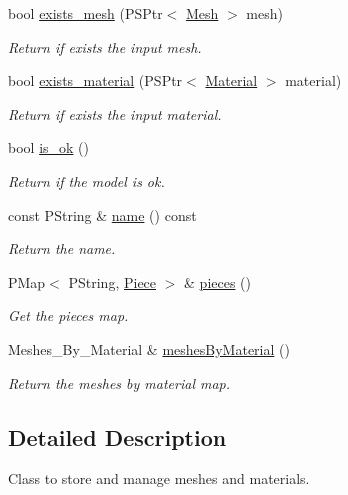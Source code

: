 \begin{DoxyCompactItemize}
bool \mbox{\hyperlink{classprz_1_1_model_a9abedee0fc21b70b26df34720dfa376c}{exists\+\_\+mesh}} (P\+S\+Ptr$<$ \mbox{\hyperlink{classprz_1_1_mesh}{Mesh}} $>$ mesh)
\begin{DoxyCompactList}\small\item\em Return if exists the input mesh. \end{DoxyCompactList}\item 
bool \mbox{\hyperlink{classprz_1_1_model_a7d0d73cf0a3adf35a3a2cceddbde878e}{exists\+\_\+material}} (P\+S\+Ptr$<$ \mbox{\hyperlink{classprz_1_1_material}{Material}} $>$ material)
\begin{DoxyCompactList}\small\item\em Return if exists the input material. \end{DoxyCompactList}\item 
bool \mbox{\hyperlink{classprz_1_1_model_a16fda70601dfe40015b6d593aae2b71b}{is\+\_\+ok}} ()
\begin{DoxyCompactList}\small\item\em Return if the model is ok. \end{DoxyCompactList}\item 
const P\+String \& \mbox{\hyperlink{classprz_1_1_model_aa9a4c5370ebe94b8d34c83e7b6317239}{name}} () const
\begin{DoxyCompactList}\small\item\em Return the name. \end{DoxyCompactList}\item 
P\+Map$<$ P\+String, \mbox{\hyperlink{structprz_1_1_model_1_1_piece}{Piece}} $>$ \& \mbox{\hyperlink{classprz_1_1_model_ace7ab981e121cb00ded294060131aaf1}{pieces}} ()
\begin{DoxyCompactList}\small\item\em Get the pieces map. \end{DoxyCompactList}\item 
Meshes\+\_\+\+By\+\_\+\+Material \& \mbox{\hyperlink{classprz_1_1_model_abc463fe1a08047ad01acc0ac3771c595}{meshes\+By\+Material}} ()
\begin{DoxyCompactList}\small\item\em Return the meshes by material map. \end{DoxyCompactList}\end{DoxyCompactItemize}


\subsection{Detailed Description}
Class to store and manage meshes and materials. 



